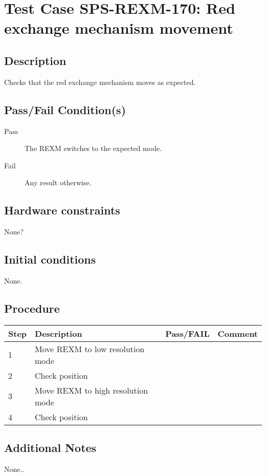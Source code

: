 \section{Test Case SPS-REXM-170: Red exchange mechanism movement}

\subsection{Description}

Checks that the red exchange mechanism moves as expected.

\subsection{Pass/Fail Condition(s)}

\begin{description}
\item [Pass] The REXM switches to the expected mode.
\item [Fail] Any result otherwise. 
\end{description}

\subsection{Hardware constraints}

None?

\subsection{Initial conditions}

None.

\subsection{Procedure}

\begin{table}[H]
    \begin{tabular}{|l| p{5cm} |l| p{5cm} |}
    \hline
    {\bf Step} & {\bf Description} & {\bf Pass/FAIL} & {\bf Comment}  \\ \hline
    1 & Move REXM to low resolution mode &  &  \\ \hline
    2 & Check position &  &  \\ \hline
    3 & Move REXM to high resolution mode &  &  \\ \hline
    4 & Check position &  &  \\ \hline
    \end{tabular}
\end{table}


\subsection{Additional Notes}

None..
